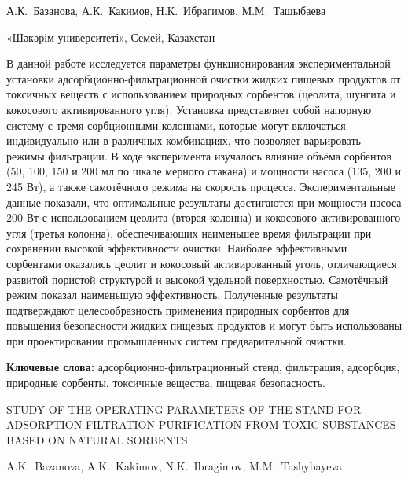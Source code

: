 
\begin{header}

А.К.~Базанова\envelope,
А.К.~Какимов,
Н.К.~Ибрагимов,
М.М.~Ташыбаева
\end{header}

\begin{affil}
«Шәкәрім университеті», Семей, Казахстан

\end{affil}

В данной работе исследуется параметры функционирования экспериментальной
установки ад\-сорбционно-фильтрационной очистки жидких пищевых продуктов
от токсичных веществ с использованием природных сорбентов (цеолита,
шунгита и кокосового активированного угля). Установка представляет собой
напорную систему с тремя сорбционными колоннами, которые могут
включаться индивидуально или в различных комбинациях, что позволяет
варьировать режимы фильтрации. В ходе эксперимента изучалось влияние
объёма сорбентов (50, 100, 150 и 200 мл по шкале мерного стакана) и
мощности насоса (135, 200 и 245 Вт), а также самотёчного режима на
скорость процесса. Экспериментальные данные показали, что оптимальные
результаты достигаются при мощности насоса 200 Вт с использованием
цеолита (вторая колонна) и кокосового активированного угля (третья
колонна), обеспечивающих наименьшее время фильтрации при сохранении
высокой эффективности очистки. Наиболее эффективными сорбентами
оказались цеолит и кокосовый активированный уголь, отличающиеся развитой
пористой структурой и высокой удельной поверхностью. Самотёчный режим
показал наименьшую эффективность. Полученные результаты подтверждают
целесообразность применения природных сорбентов для повышения
безопасности жидких пищевых продуктов и могут быть использованы при
проектировании промышленных систем предварительной очистки.

{\bfseries Ключевые слова:} адсорбционно-фильтрационный стенд, фильтрация,
адсорбция, природные сорбенты, токсичные вещества, пищевая безопасность.

\begin{header}
STUDY OF THE OPERATING PARAMETERS OF THE STAND FOR ADSORPTION-FILTRATION PURIFICATION FROM TOXIC SUBSTANCES BASED ON NATURAL SORBENTS

A.K.~Bazanova\envelope,
A.K.~Kakimov,
N.K.~Ibragimov,
M.M.~Tashybayeva
\end{header}

